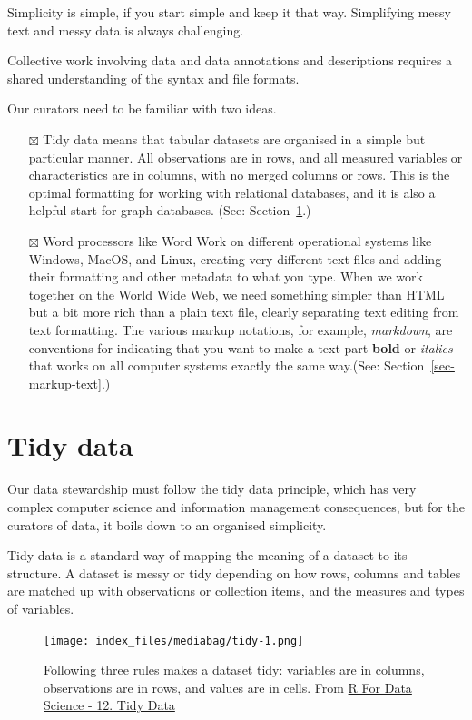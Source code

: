 \documentclass[
  letterpaper,
  DIV=11,
  numbers=noendperiod]{scrreprt}
\begin{document}
Simplicity is simple, if you start simple and keep it that way.
Simplifying messy text and messy data is always challenging.

Collective work involving data and data annotations and descriptions
requires a shared understanding of the syntax and file formats.

Our curators need to be familiar with two ideas.

\begin{itemize}
\item[$\boxtimes$]
  Tidy data means that tabular datasets are organised in a simple but
  particular manner. All observations are in rows, and all measured
  variables or characteristics are in columns, with no merged columns or
  rows. This is the optimal formatting for working with relational
  databases, and it is also a helpful start for graph databases. (See:
  Section~\ref{sec-tidy-data}.)
\item[$\boxtimes$]
  Word processors like Word Work on different operational systems like
  Windows, MacOS, and Linux, creating very different text files and
  adding their formatting and other metadata to what you type. When we
  work together on the World Wide Web, we need something simpler than
  HTML but a bit more rich than a plain text file, clearly separating
  text editing from text formatting. The various markup notations, for
  example, \emph{markdown}, are conventions for indicating that you want
  to make a text part \textbf{bold} or \emph{italics} that works on all
  computer systems exactly the same way.(See:
  Section~\ref{sec-markup-text}.)
\end{itemize}

\section{Tidy data}\label{sec-tidy-data}

Our data stewardship must follow the tidy data principle, which has very
complex computer science and information management consequences, but
for the curators of data, it boils down to an organised simplicity.

Tidy data is a standard way of mapping the meaning of a dataset to its
structure. A dataset is messy or tidy depending on how rows, columns and
tables are matched up with observations or collection items, and the
measures and types of variables.

\begin{figure}[H]

{\centering \texttt{[image: index\_files/mediabag/tidy-1.png]}

}

\caption{Following three rules makes a dataset tidy: variables are in
columns, observations are in rows, and values are in cells. From
\href{https://r4ds.had.co.nz/tidy-data.html}{R For Data Science - 12.
Tidy Data}}

\end{figure}%
\end{document}
